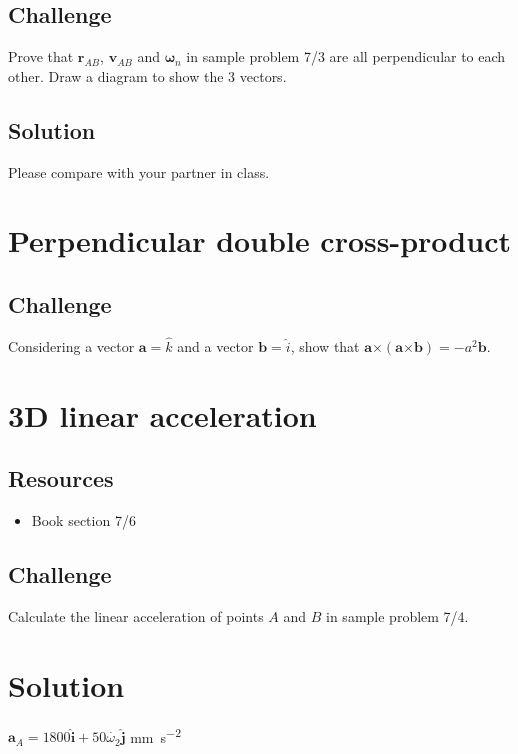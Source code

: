 \subsection*{Challenge}
Prove that $\bm{r}_{AB}$, $\bm{v}_{AB}$ and $\bm{\omega}_n$ in sample problem 7/3 are all perpendicular to each other. Draw a diagram to show the 3 vectors.

\subsection*{Solution}
Please compare with your partner in class.




\newpage
\section{Perpendicular double cross-product}

\subsection*{Challenge}
Considering a vector $\bm{a} = \hat{k}$ and a vector $\bm{b} = \hat{i}$, show that $\bm{a} \bm{\times} (\bm{a} \bm{\times} \bm{b}) = -a^2 \bm{b}$.




\newpage
\section{3D linear acceleration}

\subsection*{Resources}
\begin{itemize}
    \item Book section 7/6
\end{itemize}

\subsection*{Challenge}
Calculate the linear acceleration of points $A$ and $B$ in sample problem 7/4.

\section*{Solution}
$\bm{a}_A = 1800 \bm{\hat{i}} + 50 \dot{\omega_2} \bm{\hat{j}}$ \si{\mm\per\square\second}

